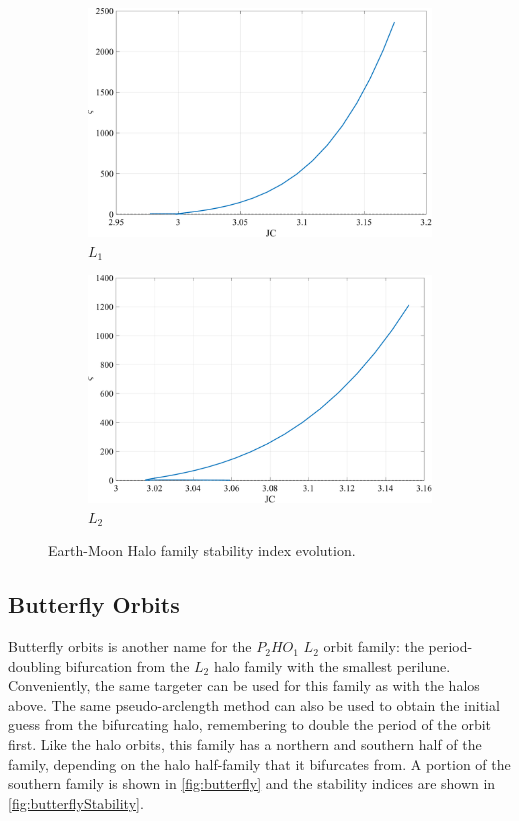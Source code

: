 \begin{figure}[ht]
    \begin{subfigure}[h]{0.4\linewidth}
        \includegraphics[width=\textwidth]{figures/L1HaloStability.pdf}
        \caption{$L_{1}$}
    \end{subfigure}
    \hfill
    \begin{subfigure}[h]{0.4\linewidth}
        \includegraphics[width=\textwidth]{figures/L2HaloStability.pdf}
        \caption{$L_{2}$}
    \end{subfigure}
    \caption{Earth-Moon Halo family stability index evolution.}
    \label{fig:haloStability}
\end{figure}

\subsection{Butterfly Orbits}
Butterfly orbits is another name for the $P_{2}HO_{1}$ $L_{2}$ orbit family: the period-doubling
bifurcation from the $L_{2}$ halo family with the smallest perilune\cite{ZimovanSpreen:2021}.
Conveniently, the same targeter can be used for this family as with the halos above. The same
pseudo-arclength method can also be used to obtain the initial guess from the bifurcating halo,
remembering to double the period of the orbit first. Like the halo orbits, this family has a
northern and southern half of the family, depending on the halo half-family that it bifurcates
from. A portion of the southern family is shown in \cref{fig:butterfly} and the stability indices
are shown in \cref{fig:butterflyStability}.

